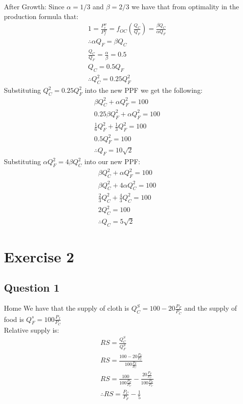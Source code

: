 \documentclass{article}
\begin{document}
After Growth:
Since $\alpha = 1/3$ and $\beta = 2/3$ we have that from optimality in the production formula that:
\begin{gather*}
  1 = \frac{P_{c}^{w}}{P_{f}^{w}} = f_{OC}(\frac{Q_{C}}{Q_{F}}) = \frac{\beta Q_{C}}{\alpha Q_{F}} \\
  \therefore \alpha Q_{F} = \beta Q_{C} \\
  \frac{Q_{C}}{Q_{F}} = \frac{\alpha}{\beta} = 0.5 \\
  Q_{C} = 0.5 Q_{F} \\
  \therefore Q_{C}^{2} = 0.25 Q_{F}^{2}
\end{gather*}
Substituting $Q_{C}^{2} = 0.25 Q_{F}^{2}$ into the new PPF we get the following:
\begin{gather*}
  \beta Q_{C}^{2} + \alpha Q_{F}^{2} = 100 \\
  0.25 \beta Q_{F}^{2} + \alpha Q_{F}^{2} = 100 \\
  \frac{1}{6}Q_{F}^{2} + \frac{1}{3}Q_{F}^{2} = 100 \\
  0.5Q_{F}^{2} = 100 \\
  \therefore Q_{F} = 10 \sqrt{2}
\end{gather*}
Substituting $\alpha Q_{F}^{2} = 4 \beta Q_{C}^{2}$ into our new PPF:
\begin{gather*}
  \beta Q_{C}^{2} + \alpha Q_{F}^{2} = 100 \\
  \beta Q_{C}^{2} + 4 \alpha Q_{C}^{2} = 100 \\
  \frac{2}{3} Q_{C}^{2} + \frac{4}{3} Q_{C}^{2} = 100 \\
  2Q_{C}^{2} = 100 \\
  \therefore Q_{C} = 5 \sqrt{2}
\end{gather*}


\section{Exercise 2}
\vspace{6mm}
\subsection{Question 1}

Home
We have that the supply of cloth is $Q_{C}^{S} = 100 - 20 \frac{P_{F}}{P_{C}}$ and the supply of food is $Q_{F}^{s} = 100 \frac{P_{f}}{P_{C}}$ \\
Relative supply is:
\begin{gather*}
  RS = \frac{Q_{C}^{S}}{Q_{F}^{S}} \\
  RS = \frac{100 - 20 \frac{P_{F}}{P_{C}}}{100 \frac{P_{F}}{P_{C}}} \\
  RS = \frac{100}{100 \frac{P_{F}}{P_{C}}} - \frac{20 \frac{P_{F}}{P_{C}}}{100 \frac{P_{F}}{P_{C}}} \\
  \therefore RS = \frac{P_{C}}{P_{F}} - \frac{1}{5}
\end{gather*}
\end{document}
